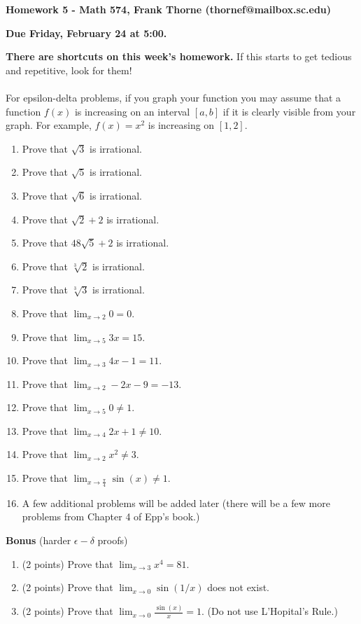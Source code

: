\documentclass[12pt]{article}
\begin{document}
\setlength{\topmargin}{-2mm}





\begin{center}{\bf Homework 5 - Math 574, Frank Thorne (thornef@mailbox.sc.edu)}
\end{center}
\begin{center}
{\bf Due Friday, February 24 at 5:00.}
\end{center}
{\bf There are shortcuts on this week's homework.} If this starts to get tedious and repetitive, look for them!
\\
\\
For epsilon-delta problems, if you graph your function you may assume that a function $f(x)$ is increasing
on an interval $[a, b]$ if it is clearly visible from your graph. For example, $f(x) = x^2$ is increasing
on $[1, 2]$.

\begin{enumerate}
\item
Prove that $\sqrt{3}$ is irrational.
\item
Prove that $\sqrt{5}$ is irrational.
\item
Prove that $\sqrt{6}$ is irrational.
\item
Prove that $\sqrt{2} + 2$ is irrational.
\item
Prove that $48\sqrt{5} + 2$ is irrational.
\item
Prove that $\sqrt[3]{2}$ is irrational.
\item
Prove that $\sqrt[3]{3}$ is irrational.
\item
Prove that $\lim_{x \rightarrow 2} 0 = 0.$
\item
Prove that $\lim_{x \rightarrow 5} 3x = 15.$
\item
Prove that $\lim_{x \rightarrow 3} 4x - 1 = 11.$
\item
Prove that $\lim_{x \rightarrow 2} -2x - 9 = -13.$
\item
Prove that $\lim_{x \rightarrow 5} 0 \neq 1.$
\item
Prove that $\lim_{x \rightarrow 4} 2x + 1 \neq 10.$
\item
Prove that $\lim_{x \rightarrow 2} x^2 \neq 3.$
\item
Prove that $\lim_{x \rightarrow \frac{\pi}{4}} \sin(x) \neq 1.$
\item
A few additional problems will be added later (there will be a few more problems from
Chapter 4 of Epp's book.)
\end{enumerate}
{\bf Bonus} (harder $\epsilon-\delta$ proofs)
\begin{enumerate}
\item (2 points)
Prove that $\lim_{x \rightarrow 3} x^4 = 81$.
\item (2 points)
Prove that $\lim_{x \rightarrow 0} \sin(1/x)$ does not exist.
\item (2 points)
Prove that $\lim_{x \rightarrow 0} \frac{\sin(x)}{x} = 1$. (Do not use L'Hopital's
Rule.)
\end{enumerate}
\end{document}
